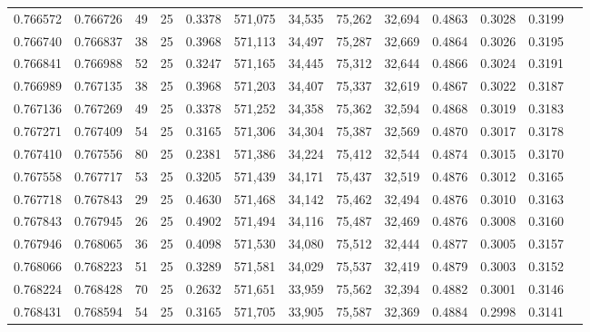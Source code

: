 \begin{tabular}{rrrrrrrrrrrrr}
0.766572 & 0.766726 &    49 &  25 &                                     0.3378 & 571,075 &  34,535 &  75,262 &  32,694 & 0.4863 & 0.3028 & 0.3199 \\
0.766740 & 0.766837 &    38 &  25 &                                     0.3968 & 571,113 &  34,497 &  75,287 &  32,669 & 0.4864 & 0.3026 & 0.3195 \\
0.766841 & 0.766988 &    52 &  25 &                                     0.3247 & 571,165 &  34,445 &  75,312 &  32,644 & 0.4866 & 0.3024 & 0.3191 \\
0.766989 & 0.767135 &    38 &  25 &                                     0.3968 & 571,203 &  34,407 &  75,337 &  32,619 & 0.4867 & 0.3022 & 0.3187 \\
0.767136 & 0.767269 &    49 &  25 &                                     0.3378 & 571,252 &  34,358 &  75,362 &  32,594 & 0.4868 & 0.3019 & 0.3183 \\
0.767271 & 0.767409 &    54 &  25 &                                     0.3165 & 571,306 &  34,304 &  75,387 &  32,569 & 0.4870 & 0.3017 & 0.3178 \\
0.767410 & 0.767556 &    80 &  25 &                                     0.2381 & 571,386 &  34,224 &  75,412 &  32,544 & 0.4874 & 0.3015 & 0.3170 \\
0.767558 & 0.767717 &    53 &  25 &                                     0.3205 & 571,439 &  34,171 &  75,437 &  32,519 & 0.4876 & 0.3012 & 0.3165 \\
0.767718 & 0.767843 &    29 &  25 &                                     0.4630 & 571,468 &  34,142 &  75,462 &  32,494 & 0.4876 & 0.3010 & 0.3163 \\
0.767843 & 0.767945 &    26 &  25 &                                     0.4902 & 571,494 &  34,116 &  75,487 &  32,469 & 0.4876 & 0.3008 & 0.3160 \\
0.767946 & 0.768065 &    36 &  25 &                                     0.4098 & 571,530 &  34,080 &  75,512 &  32,444 & 0.4877 & 0.3005 & 0.3157 \\
0.768066 & 0.768223 &    51 &  25 &                                     0.3289 & 571,581 &  34,029 &  75,537 &  32,419 & 0.4879 & 0.3003 & 0.3152 \\
0.768224 & 0.768428 &    70 &  25 &                                     0.2632 & 571,651 &  33,959 &  75,562 &  32,394 & 0.4882 & 0.3001 & 0.3146 \\
0.768431 & 0.768594 &    54 &  25 &                                     0.3165 & 571,705 &  33,905 &  75,587 &  32,369 & 0.4884 & 0.2998 & 0.3141 \\

\end{tabular}
